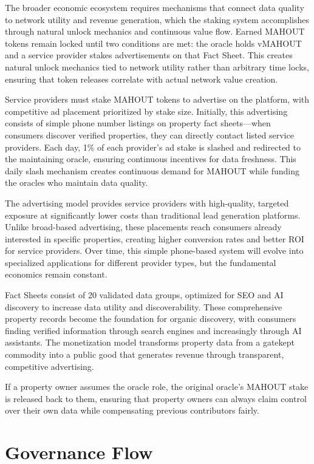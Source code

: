 The broader economic ecosystem requires mechanisms that connect data quality to network utility and revenue generation, which the staking system accomplishes through natural unlock mechanics and continuous value flow. Earned MAHOUT tokens remain locked until two conditions are met: the oracle holds vMAHOUT and a service provider stakes advertisements on that Fact Sheet. This creates natural unlock mechanics tied to network utility rather than arbitrary time locks, ensuring that token releases correlate with actual network value creation.

Service providers must stake MAHOUT tokens to advertise on the platform, with competitive ad placement prioritized by stake size. Initially, this advertising consists of simple phone number listings on property fact sheets---when consumers discover verified properties, they can directly contact listed service providers. Each day, 1\% of each provider's ad stake is slashed and redirected to the maintaining oracle, ensuring continuous incentives for data freshness. This daily slash mechanism creates continuous demand for MAHOUT while funding the oracles who maintain data quality.

The advertising model provides service providers with high-quality, targeted exposure at significantly lower costs than traditional lead generation platforms. Unlike broad-based advertising, these placements reach consumers already interested in specific properties, creating higher conversion rates and better ROI for service providers. Over time, this simple phone-based system will evolve into specialized applications for different provider types, but the fundamental economics remain constant.

Fact Sheets consist of 20 validated data groups, optimized for SEO and AI discovery to increase data utility and discoverability. These comprehensive property records become the foundation for organic discovery, with consumers finding verified information through search engines and increasingly through AI assistants. The monetization model transforms property data from a gatekept commodity into a public good that generates revenue through transparent, competitive advertising.

If a property owner assumes the oracle role, the original oracle's MAHOUT stake is released back to them, ensuring that property owners can always claim control over their own data while compensating previous contributors fairly.

\section{Governance Flow}

